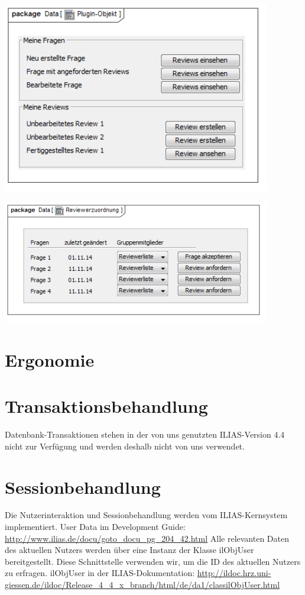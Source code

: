 \documentclass[a4paper]{scrreprt}
\begin{document}
\includegraphics[width=0.88\textwidth]{User_Interface_Modeling_Diagram__Plugin-Objekt.png}
\label{Grafische Benutzeroberfläche Review}

\includegraphics[width=0.88\textwidth]{User_Interface_Modeling_Diagram__Reviewerzuordnung.png}
\label{Grafische Benutzeroberfläche Autor}\section{Ergonomie}


\section{Transaktionsbehandlung}

Datenbank-Transaktionen stehen in der von uns genutzten ILIAS-Version 4.4 nicht zur Verfügung und werden deshalb nicht von uns verwendet.

\section{Sessionbehandlung}

Die Nutzerinteraktion und Sessionbehandlung werden vom ILIAS-Kernsystem implementiert.
User Data im Development Guide: \url{http://www.ilias.de/docu/goto_docu_pg_204_42.html}
Alle relevanten Daten des aktuellen Nutzers werden über eine Instanz der Klasse ilObjUser bereitgestellt. 
Diese Schnittstelle verwenden wir, um die ID des aktuellen Nutzers zu erfragen.
ilObjUser in der ILIAS-Dokumentation: \url{http://ildoc.hrz.uni-giessen.de/ildoc/Release_4_4_x_branch/html/de/da1/classilObjUser.html}
\end{document}

